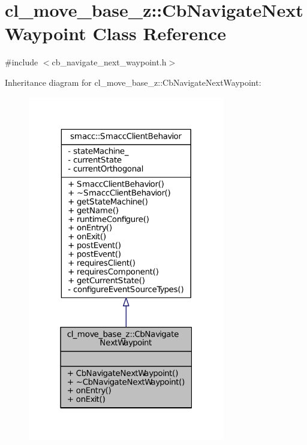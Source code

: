 \hypertarget{classcl__move__base__z_1_1CbNavigateNextWaypoint}{}\section{cl\+\_\+move\+\_\+base\+\_\+z\+:\+:Cb\+Navigate\+Next\+Waypoint Class Reference}
\label{classcl__move__base__z_1_1CbNavigateNextWaypoint}


{\ttfamily \#include $<$cb\+\_\+navigate\+\_\+next\+\_\+waypoint.\+h$>$}



Inheritance diagram for cl\+\_\+move\+\_\+base\+\_\+z\+:\+:Cb\+Navigate\+Next\+Waypoint\+:
\nopagebreak
\begin{figure}[H]
\begin{center}
\leavevmode
\includegraphics[width=244pt]{classcl__move__base__z_1_1CbNavigateNextWaypoint__inherit__graph}
\end{center}
\end{figure}


